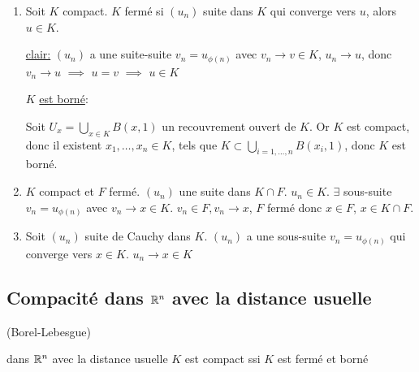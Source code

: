 \begin{preuve}
   \begin{enumerate}
       \item Soit $K$ compact.  $K$ fermé si  $(u_n)$ suite dans  $K$ qui converge vers  $u$, alors  $u \in K$.
           \par
           \underline{clair:}  $(u_n)$ a une suite-suite  $v_n = u_{\phi(n)}$ avec $v_n \to v \in K$, $u_n \to u$, donc $v_n \to u$ $\implies$ $u = v$  $\implies$ $u \in K$
           \par
           $K$ \underline{est borné}:
           \par
              Soit $U_x = \bigcup_{x \in K} B(x, 1)$ un recouvrement ouvert de $K$. Or  $K$ est compact, donc il existent  $x_1, \ldots, x_n \in K$, tels que $K \subset \bigcup_{i = 1, \ldots, n} B(x_i, 1) $, donc $K$ est borné.
        \item $K$ compact et $F$ fermé. $(u_n)$ une suite dans $K \cap F$. $u_n \in K$. $ \exists$ sous-suite $v_n = u_{\phi(n)}$ avec $v_n \to x \in K$. $v_n \in F, v_n \to x$, $F$ fermé donc $x \in F$, $x \in K \cap F$.
        \item Soit $(u_n)$ suite de Cauchy dans $K$. $(u_n)$ a une sous-suite $v_n = u_ { \phi(n)}$ qui converge vers $x \in K$. $u_n \to x \in K$
   \end{enumerate} 
\end{preuve}

\subsection{Compacité dans $\mathbb{R}^n$ avec la distance usuelle}
\begin{theorem}
    (Borel-Lebesgue)
    \par
    dans $\mathbb{R}^n$ avec la distance usuelle $K$ est compact ssi  $K$ est fermé et borné
\end{theorem}

